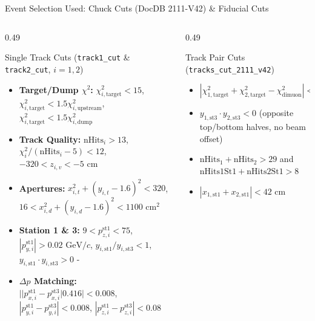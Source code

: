 \documentclass[aspectratio=169, 10pt]{beamer}
\begin{document}
\begin{frame}{Event Selection Used: Chuck Cuts (DocDB 2111-V42) \& Fiducial Cuts}
\begin{columns}[T, onlytextwidth]
\begin{column}{0.49\textwidth}
        \begin{block}{\scriptsize Single Track Cuts (\texttt{track1\_cut} \& \texttt{track2\_cut}, $i=1,2$)}
            \tiny
            \begin{itemize}
                \item \textbf{Target/Dump $\chi^2$:} $\chi^2_{i,\text{target}} < 15$, $\chi^2_{i,\text{target}} < 1.5\chi^2_{i,\text{upstream}}$, $\chi^2_{i,\text{target}} < 1.5\chi^2_{i,\text{dump}}$
                \item \textbf{Track Quality:} $\text{nHits}_i > 13$, $\chi^2_i / (\text{nHits}_i - 5) < 12$, $-320 < z_{i,v} < -5\text{ cm}$
                \item \textbf{Apertures:} $x_{i,t}^2 + (y_{i,t} - 1.6)^2 < 320$, $16 < x_{i,d}^2 + (y_{i,d} - 1.6)^2 < 1100\text{ cm}^2$
                \item \textbf{Station 1 \& 3:} $9 < p_{z,i}^{\text{st1}} < 75$, $|p_{y,i}^{\text{st1}}| > 0.02\text{ GeV}/c$, $y_{i,\text{st1}}/y_{i,\text{st3}} < 1$, $y_{i,\text{st1}} \cdot y_{i,\text{st3}} > 0$
-                 \item \textbf{$\Delta p$ Matching:} $||p_{x,i}^{\text{st1}} - p_{x,i}^{\text{st3}}|0.416
| < 0.008$, $|p_{y,i}^{\text{st1}} - p_{y,i}^{\text{st3}}| < 0.008$, $|p_{z,i}^{\text{st1}} - p_{z,i}^{\text{st3}}| < 0.08$
            \end{itemize}
        \end{block}
    \end{column}

    \begin{column}{0.49\textwidth}
        \begin{block}{\scriptsize Track Pair Cuts (\texttt{tracks\_cut\_2111\_v42})}
            \tiny
            \begin{itemize}
                \item $|\chi^2_{1,\text{target}} + \chi^2_{2,\text{target}} - \chi^2_{\text{dimuon}}| < 2.0$
                \item $y_{1,\text{st3}} \cdot y_{2,\text{st3}} < 0$ (opposite top/bottom halves, no beam offset)
                \item $\text{nHits}_1 + \text{nHits}_2 > 29$ and $\text{nHits1St1} + \text{nHits2St1} > 8$
                \item $|x_{1,\text{st1}} + x_{2,\text{st1}}| < 42\text{ cm}$
            \end{itemize}
        \end{block}


\end{column}
\end{columns}
\end{frame}
\end{document}
